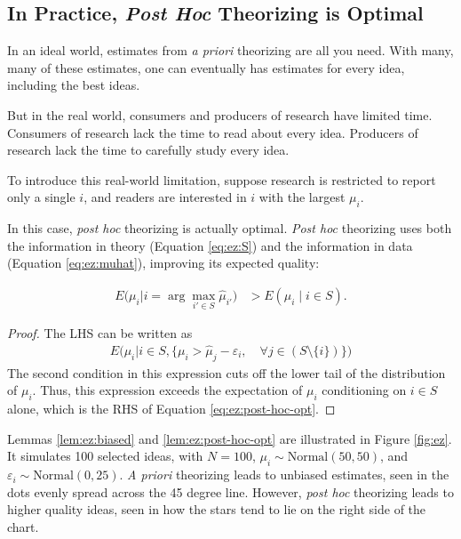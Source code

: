 \documentclass[12pt,english]{article}
\theoremstyle{plain}
\theoremstyle{plain}
\begin{document}
\subsection{In Practice, \emph{Post Hoc} Theorizing is Optimal}\label{sec:ez:practical}

In an ideal world, estimates from \emph{a priori} theorizing are all you need. With many, many of these estimates, one can eventually has estimates for every idea, including the best ideas.

But in the real world, consumers and producers of research have limited time. Consumers of research lack the time to read about every idea. Producers of research lack the time to carefully study every idea.

To introduce this real-world limitation, suppose research is restricted to report only a single $i$, and readers are interested in $i$ with the largest $\mu_{i}$. 

In this case, \emph{post hoc} theorizing is actually optimal. \emph{Post hoc} theorizing uses both the information in theory (Equation \eqref{eq:ez:S}) and the information in data (Equation \eqref{eq:ez:muhat}), improving its expected quality:
\begin{lemma}\label{lem:ez:post-hoc-opt}
    \begin{align}
        E\bigg(\mu_{i}\big|i=\arg\max_{i'\in S }\hat{\mu}_{i'}\bigg) & >E\left(\mu_{i}\mid i\in S \right).
        \label{eq:ez:post-hoc-opt}
    \end{align}            
\end{lemma} 
\begin{proof}
    The LHS can be written as 
    \begin{align*}
        E\bigg(\mu_i
        \big|
        i \in S,
        \{
         \mu_i 
        > \hat{\mu}_j - \varepsilon_i
        , \quad
         \forall j \in \left( S\setminus\{i\}
         \right)
         \}
         \bigg)
    \end{align*}
The second condition in this expression cuts off the lower tail of the distribution of $\mu_i$. Thus, this expression exceeds the expectation of $\mu_i$ conditioning on $i\in S$ alone, which is the RHS of Equation \eqref{eq:ez:post-hoc-opt}.
\end{proof}

Lemmas \ref{lem:ez:biased} and \ref{lem:ez:post-hoc-opt} are illustrated in Figure \ref{fig:ez}. It simulates 100 selected ideas, with $N=100$, $\mu_i \sim \text{Normal}\left(50, 50\right)$, and $\varepsilon_i \sim \text{Normal}\left(0, 25\right)$. \emph{A priori} theorizing leads to unbiased estimates, seen in the dots evenly spread across the 45 degree line. However, \emph{post hoc} theorizing leads to higher quality ideas, seen  in how the stars tend to lie on the right side of the chart.
\end{document}
